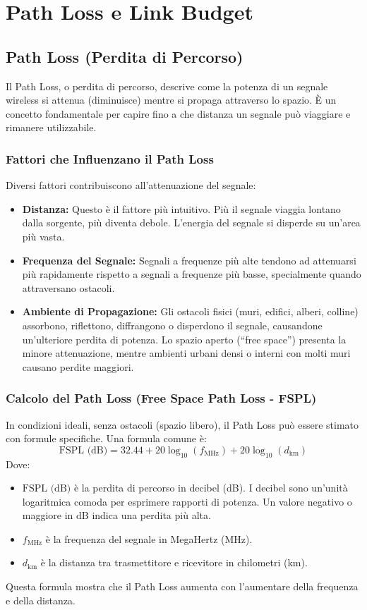 \section{Path Loss e Link Budget}

\subsection{Path Loss (Perdita di Percorso)}
Il Path Loss, o perdita di percorso, descrive come la potenza di un segnale wireless si attenua (diminuisce) mentre si propaga attraverso lo spazio. È un concetto fondamentale per capire fino a che distanza un segnale può viaggiare e rimanere utilizzabile.

\subsubsection{Fattori che Influenzano il Path Loss}
Diversi fattori contribuiscono all'attenuazione del segnale:
\begin{itemize}
    \item \textbf{Distanza:} Questo è il fattore più intuitivo. Più il segnale viaggia lontano dalla sorgente, più diventa debole. L'energia del segnale si disperde su un'area più vasta.
    \item \textbf{Frequenza del Segnale:} Segnali a frequenze più alte tendono ad attenuarsi più rapidamente rispetto a segnali a frequenze più basse, specialmente quando attraversano ostacoli.
    \item \textbf{Ambiente di Propagazione:} Gli ostacoli fisici (muri, edifici, alberi, colline) assorbono, riflettono, diffrangono o disperdono il segnale, causandone un'ulteriore perdita di potenza. Lo spazio aperto (``free space'') presenta la minore attenuazione, mentre ambienti urbani densi o interni con molti muri causano perdite maggiori.
\end{itemize}

\subsubsection{Calcolo del Path Loss (Free Space Path Loss - FSPL)}
In condizioni ideali, senza ostacoli (spazio libero), il Path Loss può essere stimato con formule specifiche. Una formula comune è:
\[ \text{FSPL (dB)} = 32.44 + 20 \log_{10}(f_{\text{MHz}}) + 20 \log_{10}(d_{\text{km}}) \]
Dove:
\begin{itemize}
    \item $\text{FSPL (dB)}$ è la perdita di percorso in decibel (dB). I decibel sono un'unità logaritmica comoda per esprimere rapporti di potenza. Un valore negativo o maggiore in dB indica una perdita più alta.
    \item $f_{\text{MHz}}$ è la frequenza del segnale in MegaHertz (MHz).
    \item $d_{\text{km}}$ è la distanza tra trasmettitore e ricevitore in chilometri (km).
\end{itemize}
Questa formula mostra che il Path Loss aumenta con l'aumentare della frequenza e della distanza.

